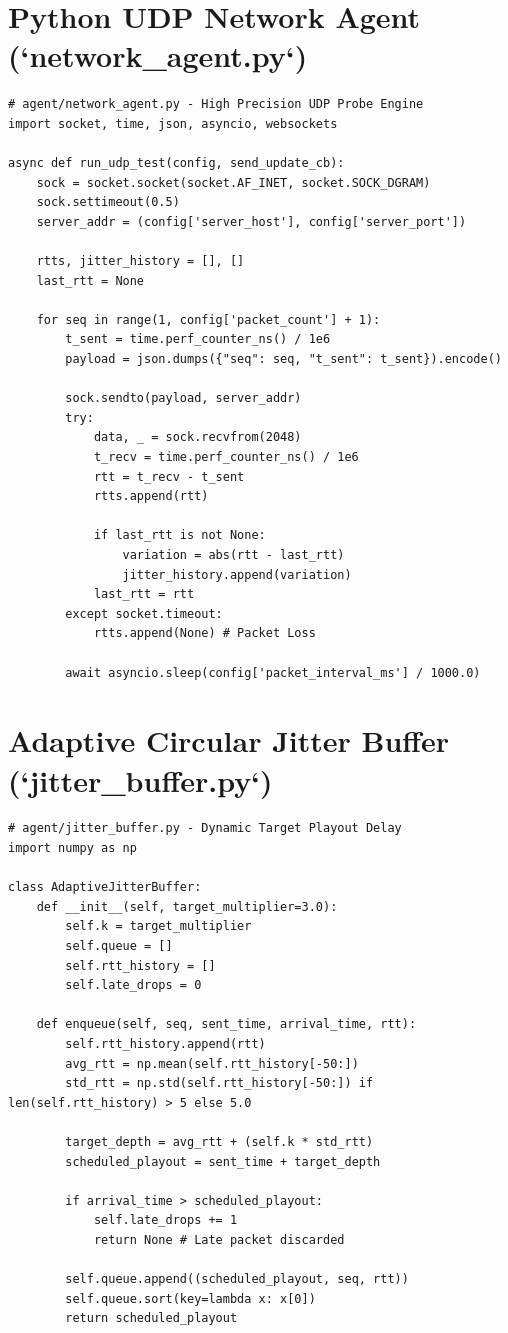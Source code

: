 \documentclass[12pt, a4paper]{report}
\begin{document}
\section{Python UDP Network Agent (`network\_agent.py`)}
\begin{verbatim}
# agent/network_agent.py - High Precision UDP Probe Engine
import socket, time, json, asyncio, websockets

async def run_udp_test(config, send_update_cb):
    sock = socket.socket(socket.AF_INET, socket.SOCK_DGRAM)
    sock.settimeout(0.5)
    server_addr = (config['server_host'], config['server_port'])
    
    rtts, jitter_history = [], []
    last_rtt = None
    
    for seq in range(1, config['packet_count'] + 1):
        t_sent = time.perf_counter_ns() / 1e6
        payload = json.dumps({"seq": seq, "t_sent": t_sent}).encode()
        
        sock.sendto(payload, server_addr)
        try:
            data, _ = sock.recvfrom(2048)
            t_recv = time.perf_counter_ns() / 1e6
            rtt = t_recv - t_sent
            rtts.append(rtt)
            
            if last_rtt is not None:
                variation = abs(rtt - last_rtt)
                jitter_history.append(variation)
            last_rtt = rtt
        except socket.timeout:
            rtts.append(None) # Packet Loss
            
        await asyncio.sleep(config['packet_interval_ms'] / 1000.0)
\end{verbatim}

\section{Adaptive Circular Jitter Buffer (`jitter\_buffer.py`)}
\begin{verbatim}
# agent/jitter_buffer.py - Dynamic Target Playout Delay
import numpy as np

class AdaptiveJitterBuffer:
    def __init__(self, target_multiplier=3.0):
        self.k = target_multiplier
        self.queue = []
        self.rtt_history = []
        self.late_drops = 0
        
    def enqueue(self, seq, sent_time, arrival_time, rtt):
        self.rtt_history.append(rtt)
        avg_rtt = np.mean(self.rtt_history[-50:])
        std_rtt = np.std(self.rtt_history[-50:]) if len(self.rtt_history) > 5 else 5.0
        
        target_depth = avg_rtt + (self.k * std_rtt)
        scheduled_playout = sent_time + target_depth
        
        if arrival_time > scheduled_playout:
            self.late_drops += 1
            return None # Late packet discarded
            
        self.queue.append((scheduled_playout, seq, rtt))
        self.queue.sort(key=lambda x: x[0])
        return scheduled_playout
\end{verbatim}
\end{document}

